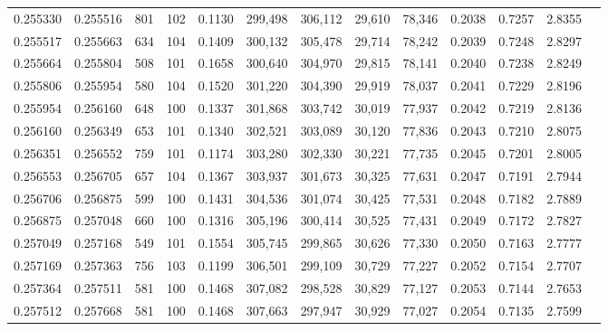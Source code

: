 \begin{tabular}{rrrrrrrrrrrrr}
0.255330 & 0.255516 &   801 & 102 &                                     0.1130 & 299,498 & 306,112 &  29,610 &  78,346 & 0.2038 & 0.7257 & 2.8355 \\
0.255517 & 0.255663 &   634 & 104 &                                     0.1409 & 300,132 & 305,478 &  29,714 &  78,242 & 0.2039 & 0.7248 & 2.8297 \\
0.255664 & 0.255804 &   508 & 101 &                                     0.1658 & 300,640 & 304,970 &  29,815 &  78,141 & 0.2040 & 0.7238 & 2.8249 \\
0.255806 & 0.255954 &   580 & 104 &                                     0.1520 & 301,220 & 304,390 &  29,919 &  78,037 & 0.2041 & 0.7229 & 2.8196 \\
0.255954 & 0.256160 &   648 & 100 &                                     0.1337 & 301,868 & 303,742 &  30,019 &  77,937 & 0.2042 & 0.7219 & 2.8136 \\
0.256160 & 0.256349 &   653 & 101 &                                     0.1340 & 302,521 & 303,089 &  30,120 &  77,836 & 0.2043 & 0.7210 & 2.8075 \\
0.256351 & 0.256552 &   759 & 101 &                                     0.1174 & 303,280 & 302,330 &  30,221 &  77,735 & 0.2045 & 0.7201 & 2.8005 \\
0.256553 & 0.256705 &   657 & 104 &                                     0.1367 & 303,937 & 301,673 &  30,325 &  77,631 & 0.2047 & 0.7191 & 2.7944 \\
0.256706 & 0.256875 &   599 & 100 &                                     0.1431 & 304,536 & 301,074 &  30,425 &  77,531 & 0.2048 & 0.7182 & 2.7889 \\
0.256875 & 0.257048 &   660 & 100 &                                     0.1316 & 305,196 & 300,414 &  30,525 &  77,431 & 0.2049 & 0.7172 & 2.7827 \\
0.257049 & 0.257168 &   549 & 101 &                                     0.1554 & 305,745 & 299,865 &  30,626 &  77,330 & 0.2050 & 0.7163 & 2.7777 \\
0.257169 & 0.257363 &   756 & 103 &                                     0.1199 & 306,501 & 299,109 &  30,729 &  77,227 & 0.2052 & 0.7154 & 2.7707 \\
0.257364 & 0.257511 &   581 & 100 &                                     0.1468 & 307,082 & 298,528 &  30,829 &  77,127 & 0.2053 & 0.7144 & 2.7653 \\
0.257512 & 0.257668 &   581 & 100 &                                     0.1468 & 307,663 & 297,947 &  30,929 &  77,027 & 0.2054 & 0.7135 & 2.7599 \\

\end{tabular}
